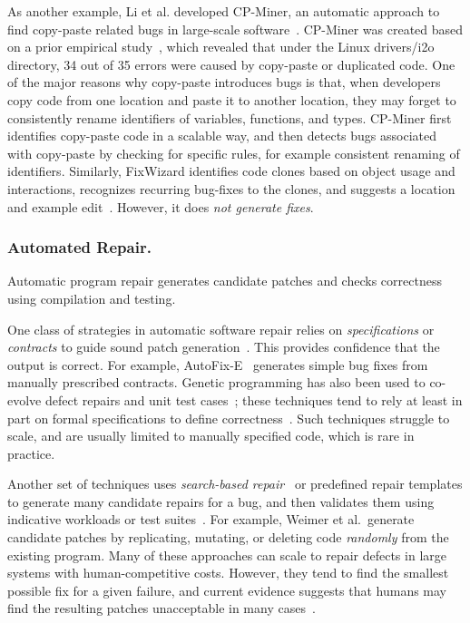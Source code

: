 As another example, Li et al. developed CP-Miner, an automatic approach to find copy-paste related bugs in large-scale software~\cite{Li2006:CPMiner}. CP-Miner was created based on a prior empirical study~\cite{Chou2001:ESO}, which revealed that under the Linux {\sf drivers/i2o} directory, 34 out of 35 errors were caused by copy-paste or duplicated code. 
One of the major reasons why copy-paste introduces bugs is that, when developers copy code from one location and paste it to another location, they may forget to consistently rename identifiers of variables, functions, and types. CP-Miner first identifies copy-paste code in a scalable way, and then detects bugs associated with copy-paste by checking for specific rules, for example consistent renaming of identifiers. %
Similarly, FixWizard identifies code clones based on object usage and interactions, recognizes recurring bug-fixes to the clones, and suggests a location and example edit~\cite{Nguyen2010:RBF}. However, it does {\em not generate fixes}.

\subsubsection{Automated Repair.} 
Automatic program repair generates candidate patches and checks correctness using compilation and testing. 

One class of strategies in automatic software repair relies on {\em specifications} or {\em contracts} to guide sound patch generation~\cite{gopinath2011, liblit2011, liu2012, semfix13,Wei:2010:AutoFix-E}. This provides confidence that the output is correct. For example, AutoFix-E~\cite{Wei:2010:AutoFix-E} generates simple bug fixes from manually prescribed contracts. Genetic programming has also been used to co-evolve defect repairs and unit test cases~\cite{Arcuri11,wilkerson2012}; these techniques tend to rely at least in part on formal specifications to define correctness~\cite{arcuriy08,wilkerson11}.  Such techniques struggle to scale, and are usually limited to manually specified code, which is rare in practice.

Another set of techniques uses {\em search-based repair}~\cite{harman07} or predefined repair templates to generate many candidate repairs for a bug, and then validates them using indicative workloads or test suites~\cite{Kim2013:PAR, genprog-icse2012, Perkins09:clearview}. For example, Weimer et al.~generate candidate patches by replicating, mutating, or deleting code \emph{randomly} from the existing program. Many of these approaches can scale to repair defects in large systems with human-competitive costs. However, they tend to find the smallest possible fix for a given failure, and current evidence suggests that humans may find the resulting patches unacceptable in many cases~\cite{genprog-maintainability,Kim2013:PAR}. 

